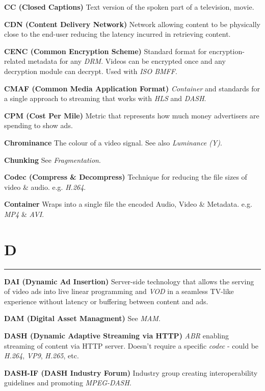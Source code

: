 \smallskip
\textbf{CC (Closed Captions)}
Text version of the spoken part of a television, movie.

\smallskip
\textbf{CDN (Content Delivery Network)}
Network allowing content to be physically close to the end-user reducing the latency incurred in retrieving content.

\smallskip
\textbf{CENC (Common Encryption Scheme)}
Standard format for encryption-related metadata for any \textit{DRM}. Videos can be encrypted once and any decryption module can decrypt.  Used with \textit{ISO BMFF}.

\smallskip
\textbf{CMAF (Common Media Application Format)}
\textit{Container} and standards for a single approach to streaming that works with \textit{HLS} and \textit{DASH}.

\smallskip
\textbf{CPM (Cost Per Mile)}
Metric that represents how much money advertisers are spending to show ads.

\smallskip
\textbf{Chrominance}
The colour of a video signal. See also \textit{Luminance (Y)}.

\smallskip
\textbf{Chunking}
See \textit{Fragmentation}.

\smallskip
\textbf{Codec (Compress \& Decompress)}
Technique for reducing the file sizes of video \& audio. e.g. \textit{H.264}.

\smallskip
\textbf{Container}
Wraps into a single file the encoded Audio, Video \& Metadata.  e.g. \textit{MP4} \& \textit{AVI}.


\section{D}
\hrule

\medskip
\textbf{DAI (Dynamic Ad Insertion)}
Server-side technology that allows the serving of video ads into live linear programming and \textit{VOD} in a seamless TV-like experience without latency or buffering between content and ads.

\smallskip
\textbf{DAM (Digital Asset Managment)}
See \textit{MAM}.

\smallskip
\textbf{DASH (Dynamic Adaptive Streaming via HTTP)}
\textit{ABR} enabling streaming of content via HTTP server. Doesn't require a specific \textit{codec} - could be \textit{H.264}, \textit{VP9}, \textit{H.265}, etc.

\smallskip
\textbf{DASH-IF (DASH Industry Forum)}
Industry group creating interoperability guidelines and promoting \textit{MPEG-DASH}.

